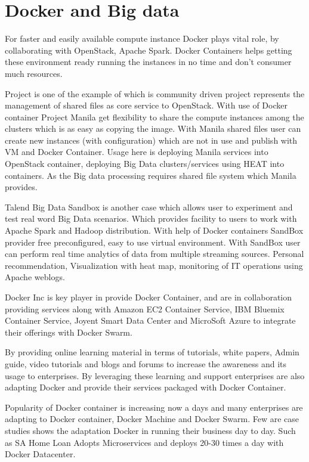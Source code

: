 \documentclass{acm_proc_article-sp}
\begin{document}
\section{Docker and Big data}
For faster and easily available compute instance Docker plays vital role, by collaborating with OpenStack, Apache Spark. Docker Containers helps getting these environment ready running the instances in no time and don't consumer much resources.

Project is one of the example of which is community driven project represents the management of shared files as core service to OpenStack. With use of Docker container Project Manila get flexibility to share the compute instances among the clusters which is as easy as copying the image. With Manila shared files user can create new instances (with configuration) which are not in use and publish with VM and Docker Container. Usage here is deploying Manila services into OpenStack container, deploying Big Data clusters/services using HEAT into containers. As the Big data processing requires shared file system which Manila provides.\cite{Manila}

Talend Big Data Sandbox is another case which allows user to experiment and test real word Big Data scenarios. Which provides facility to users to work with Apache Spark and Hadoop distribution. With help of Docker containers SandBox provider free preconfigured, easy to use virtual environment. With SandBox user can perform real time analytics of data from multiple streaming sources. Personal recommendation, Visualization with heat map, monitoring of IT operations using Apache weblogs.\cite{SandBox}

Docker Inc is key player in provide Docker Container, and are in collaboration providing services along with Amazon EC2 Container Service, IBM Bluemix Container Service, Joyent Smart Data Center and MicroSoft Azure to integrate their offerings with Docker Swarm.

By providing online learning material in terms of tutorials, white papers, Admin guide, video tutorials and blogs and forums to increase the awareness and its usage to enterprises. By leveraging these learning and support enterprises are also adapting Docker and provide their services packaged with Docker Container. 

Popularity of Docker container is increasing now a days and many enterprises are adapting to Docker container, Docker Machine and Docker Swarm. Few are case studies shows the adaptation Docker in running their business day to day. Such as SA Home Loan Adopts Microservices and deploys 20-30 times a day with Docker Datacenter.
\end{document}
